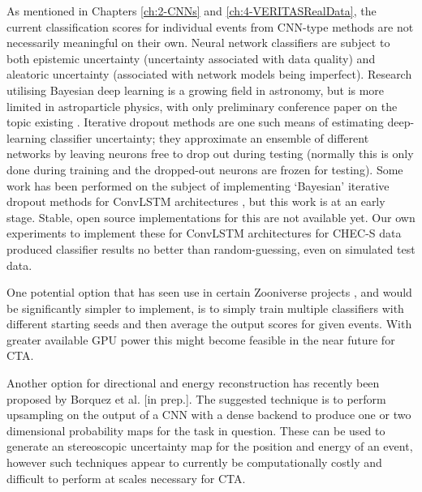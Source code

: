 As mentioned in Chapters \ref{ch:2-CNNs} and \ref{ch:4-VERITASRealData}, the current classification scores for individual events from CNN-type methods are not necessarily meaningful on their own. Neural network classifiers are subject to both epistemic uncertainty (uncertainty associated with data quality) and aleatoric uncertainty (associated with network models being imperfect). Research utilising Bayesian deep learning is a growing field in astronomy, but is more limited in astroparticle physics, with only preliminary conference paper on the topic existing \cite{bayesianwcd}. Iterative dropout methods are one such means of estimating deep-learning classifier uncertainty; they approximate an ensemble of different networks by leaving neurons free to drop out during testing (normally this is only done during training and the dropped-out neurons are frozen for testing). Some work has been performed on the subject of implementing `Bayesian' iterative dropout methods for ConvLSTM architectures \cite{bayesconv}, but this work is at an early stage. Stable, open source implementations for this are not available yet. Our own experiments to implement these for ConvLSTM architectures for CHEC-S data produced classifier results no better than random-guessing, even on simulated test data.

One potential option that has seen use in certain Zooniverse projects \cite{mike}, and would be significantly simpler to implement, is to simply train multiple classifiers with different starting seeds and then average the output scores for given events. With greater available GPU power this might become feasible in the near future for CTA.

Another option for directional and energy reconstruction has recently been proposed by Borquez et al. [in prep.]. The suggested technique is to perform upsampling on the output of a CNN with a dense backend to produce one or two dimensional probability maps for the task in question. These can be used to generate an stereoscopic uncertainty map for the position and energy of an event, however such techniques appear to currently be  computationally costly and difficult to perform at scales necessary for CTA.

